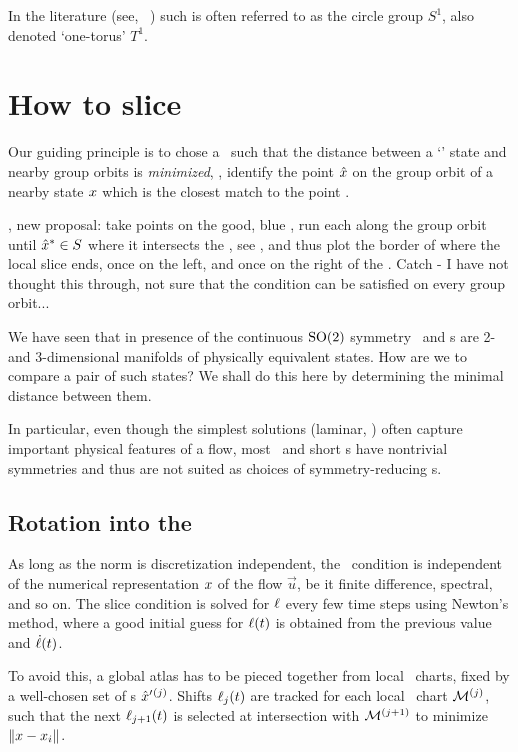 In the literature
(see, \eg\ \cite{Recke2010}) such  is often referred to as the
circle group $S^1$, also denoted `one-torus' $T^1$.

\section{How to slice}
\label{s:algorithm}

Our guiding principle is to chose a \slice\ such that the distance
between a `{\template}' state {\slicep} and nearby group orbits is
\emph{minimized}, \ie, identify the point $\hat{x}$ on the group orbit
 of a nearby state $x$ which is the closest match to
the {\template} point {\slicep}.

, new proposal: take points on the good,
    blue \po, run each along the group orbit until $\hat{x}^\ast \in S$
    where it intersects the \sliceBord, see , and thus plot
    the border of where the local slice ends, once on the left, and once
    on the right of the {\template}. Catch - I have not thought this
    through, not sure that the condition  can be
    satisfied on every group orbit...

We have seen that in presence of the continuous $\textrm{SO}(2)$ symmetry
\reqva\ and \rpo s are 2- and 3-dimensional manifolds of physically
equivalent states. How are we to compare a pair of such states? We shall
do this here by determining the minimal distance between them.

In particular, even though the
simplest solutions (laminar, \etc) often capture important physical
features of a flow, most \eqva\ and short \po s have nontrivial
symmetries and thus are not suited as choices of symmetry-reducing
{\template s}.

\subsection{Rotation into the \slice}

As long as the norm is discretization independent, the \slice\ condition
 is independent of the numerical representation $x$ of
the flow $\vec{u}$, be it finite difference, spectral, and so on. The
slice condition is solved for $\ell$ every few time steps using
Newton's method, where a good initial guess for $\ell(t)$ is
obtained from the previous value and $\dot{\ell}(t)$.

To avoid this, a global
atlas has to be pieced together from local \slice\ charts, fixed by
a well-chosen set of
\template s ${\hat{x}'}{}^{(j)}$.
Shifts $\ell_j(t)$ are tracked for each local \slice\ chart ${\cal M}{}^{(j)}$,
such that the next $\ell_{j+1}(t)$ is selected at intersection with
${\cal M}{}^{(j+1)}$
to minimize $\|{{x}-{x_i}}\|$.


